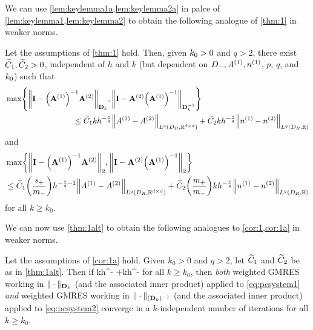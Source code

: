 We can use \cref{lem:keylemma1a,lem:keylemma2a} in palce of \cref{lem:keylemma1,lem:keylemma2} to obtain the following analogue of \cref{thm:1} in weaker norms.

\begin{theorem}\label{thm:1alt}
Let the assumptions of \cref{thm:1} hold.   Then, given $k_{0}>0$ and $q >2$, there exist $\widetilde{C}_{1}, \widetilde{C}_{2}>0$, independent of $h$ and $k$ (but dependent on $D_{-}, {A}^{(1)}, {n}^{(1)}$, $p$, $q$, and $k_{0}$) such that
\begin{align}\nonumber
&\max\set{\NDk{\Imat - \AmatoI\Amatt},\NDkI{\Imat -\Amatt\AmatoI}}\\
&\hspace{3cm} 
\leq \Cotilde kh^{-\frac{s}q} \NLqDRRRdtd{\Aso-\Ast} + \Cttilde  kh^{-\frac{s}q}  \NLqDRRR{\nso-\nst}
\label{eq:main1alt}
\end{align}
and 
\begin{align}\nonumber
&\max\set{\Nt{\Imat - \AmatoI\Amatt}, \Nt{\Imat -\Amatt\AmatoI}}\\
&\hspace{0cm}
\leq \Cotilde \mleft(\frac{\splus}{\mminus}\mright) h^{-\frac{s}q-1}\NLqDRRRdtd{\Aso-\Ast} + \Cttilde \mleft(\frac{\mplus}{\mminus}\mright) kh^{-\frac{s}q}\NLqDRRR{\nso-\nst}
\label{eq:main1aalt}
\end{align}
for all $k\geq k_0$. 
\end{theorem}

We can now use \cref{thm:1alt} to obtain the following analogues to \cref{cor:1,cor:1a} in weaker norms.

\label{cor:1alt}
Let the assumptions of \cref{cor:1a} hold.  Given $k_0>0$ and $q >2$, let $\widetilde{C}_{1}$ and $\widetilde{C}_{2}$ be as in \cref{thm:1alt}. Then if 
\beq\label{eq:condalt}
\Cotilde kh^{-} \NLqDRRRdtd{\Aso-\Ast} +\Cttilde  kh^{-} \NLqDRRR{\nso-\nst}
\leq {}
\eeq
for all $k\geq k_0$, then \emph{both} weighted GMRES working in $\|\cdot\|_{\mathbf{D}_k}$ (and the associated inner product) applied to \cref{eq:pcsystem1} \emph{and} weighted GMRES working in $\|\cdot\|_{(\mathbf{D}_k)^{-1}}$ (and the associated inner product) applied to \cref{eq:pcsystem2}  converge in a $k$-independent number of iterations for all $k\geq k_0$.
\enth

